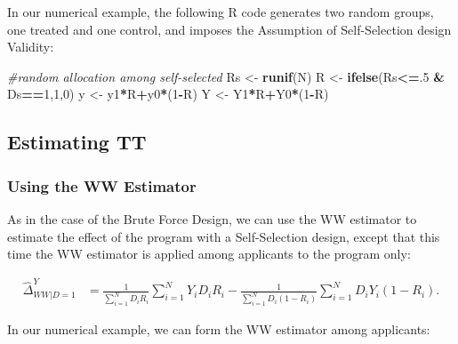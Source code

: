 \documentclass[]{book}
\newenvironment{Shaded}{\begin{snugshade}}{\end{snugshade}}
\newcommand{\CommentTok}[1]{\textcolor[rgb]{0.56,0.35,0.01}{\textit{#1}}}
\newcommand{\DecValTok}[1]{\textcolor[rgb]{0.00,0.00,0.81}{#1}}
\newcommand{\KeywordTok}[1]{\textcolor[rgb]{0.13,0.29,0.53}{\textbf{#1}}}
\newcommand{\NormalTok}[1]{#1}
\newcommand{\OperatorTok}[1]{\textcolor[rgb]{0.81,0.36,0.00}{\textbf{#1}}}
\newcommand{\StringTok}[1]{\textcolor[rgb]{0.31,0.60,0.02}{#1}}
\theoremstyle{definition}
\theoremstyle{definition}
\theoremstyle{definition}
\theoremstyle{remark}
\let\BeginKnitrBlock\begin \let\EndKnitrBlock\end
\begin{document}
\BeginKnitrBlock{example}
\protect\hypertarget{exm:unnamed-chunk-82}{}{\label{exm:unnamed-chunk-82} }In our numerical example, the following R code generates two random groups, one treated and one control, and imposes the Assumption of Self-Selection design Validity:
\EndKnitrBlock{example}

\begin{Shaded}
\begin{Highlighting}[]
\CommentTok{#random allocation among self-selected}
\NormalTok{Rs <-}\StringTok{ }\KeywordTok{runif}\NormalTok{(N)}
\NormalTok{R <-}\StringTok{ }\KeywordTok{ifelse}\NormalTok{(Rs}\OperatorTok{<=}\NormalTok{.}\DecValTok{5} \OperatorTok{&}\StringTok{ }\NormalTok{Ds}\OperatorTok{==}\DecValTok{1}\NormalTok{,}\DecValTok{1}\NormalTok{,}\DecValTok{0}\NormalTok{)}
\NormalTok{y <-}\StringTok{ }\NormalTok{y1}\OperatorTok{*}\NormalTok{R}\OperatorTok{+}\NormalTok{y0}\OperatorTok{*}\NormalTok{(}\DecValTok{1}\OperatorTok{-}\NormalTok{R)}
\NormalTok{Y <-}\StringTok{ }\NormalTok{Y1}\OperatorTok{*}\NormalTok{R}\OperatorTok{+}\NormalTok{Y0}\OperatorTok{*}\NormalTok{(}\DecValTok{1}\OperatorTok{-}\NormalTok{R)}
\end{Highlighting}
\end{Shaded}

\hypertarget{estimating-tt}{%
\subsection{Estimating TT}\label{estimating-tt}}

\hypertarget{using-the-ww-estimator-1}{%
\subsubsection{Using the WW Estimator}\label{using-the-ww-estimator-1}}

As in the case of the Brute Force Design, we can use the WW estimator to estimate the effect of the program with a Self-Selection design, except that this time the WW estimator is applied among applicants to the program only:

\begin{align*}
  \hat{\Delta}^Y_{WW|D=1} & = \frac{1}{\sum_{i=1}^N D_iR_i}\sum_{i=1}^N Y_iD_iR_i-\frac{1}{\sum_{i=1}^N D_i(1-R_i)}\sum_{i=1}^N D_iY_i(1-R_i).
\end{align*}

\BeginKnitrBlock{example}
\protect\hypertarget{exm:unnamed-chunk-83}{}{\label{exm:unnamed-chunk-83} }In our numerical example, we can form the WW estimator among applicants:
\EndKnitrBlock{example}
\end{document}
